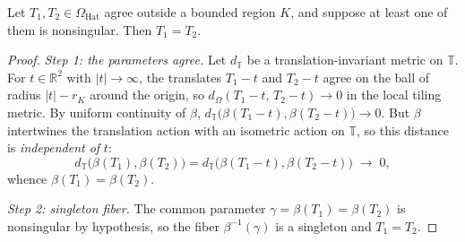 \documentclass[10pt,a4paper]{amsart}
\newcommand{\OHat}{\Omega_{\mathrm{Hat}}}
\newcommand{\RR}{\mathbb{R}}
\begin{document}
\begin{theorem}
\label{thm:recover}
Let $T_{1}, T_{2} \in \OHat$ agree outside a bounded region $K$, and
suppose at least one of them is nonsingular. Then $T_{1} = T_{2}$.
\end{theorem}

\begin{proof}
\emph{Step 1: the parameters agree.} Let $d_{\mathbb{T}}$ be a
translation-invariant metric on $\mathbb{T}$. For $t \in \RR^{2}$
with $|t| \to \infty$, the translates $T_{1} - t$ and $T_{2} - t$
agree on the ball of radius $|t| - r_{K}$ around the origin, so
$d_{\Omega}(T_{1} - t,\, T_{2} - t) \to 0$ in the local tiling
metric. By uniform continuity of $\beta$,
$d_{\mathbb{T}}\bigl( \beta(T_{1} - t), \beta(T_{2} - t) \bigr) \to
0$. But $\beta$ intertwines the translation action with an isometric
action on $\mathbb{T}$, so this distance is \emph{independent of}
$t$:
\[
d_{\mathbb{T}}\bigl( \beta(T_{1}), \beta(T_{2}) \bigr)
 = d_{\mathbb{T}}\bigl( \beta(T_{1} - t), \beta(T_{2} - t) \bigr)
 \;\longrightarrow\; 0 ,
\]
whence $\beta(T_{1}) = \beta(T_{2})$.

\emph{Step 2: singleton fiber.} The common parameter
$\gamma = \beta(T_{1}) = \beta(T_{2})$ is nonsingular by hypothesis,
so the fiber $\beta^{-1}(\gamma)$ is a singleton and
$T_{1} = T_{2}$.
\end{proof}
\end{document}
